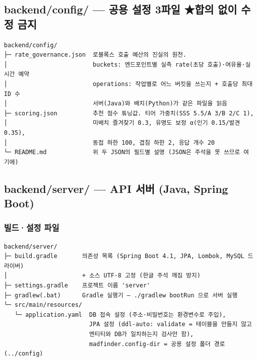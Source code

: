 \documentclass[11pt]{article}
\begin{document}
\subsection{backend/config/ --- 공용 설정 3파일 ★합의 없이 수정 금지}
\begin{Verbatim}[frame=single, fontsize=\small]
backend/config/
├─ rate_governance.json  로블록스 호출 예산의 진실의 원천.
│                        buckets: 엔드포인트별 실측 rate(초당 호출)·여유율·실시간 예약
│                        operations: 작업별로 어느 버킷을 쓰는지 + 호출당 최대 ID 수
│                        서버(Java)와 배치(Python)가 같은 파일을 읽음
├─ scoring.json          추천 점수 튜닝값. 티어 가중치(SSS 5.5/A 3/B 2/C 1),
│                        미배치 즐겨찾기 0.3, 유명도 보정 α(인기 0.15/발견 0.35),
│                        동접 하한 100, 겹침 하한 2, 응답 개수 20
└─ README.md             위 두 JSON의 필드별 설명 (JSON은 주석을 못 쓰므로 여기에)
\end{Verbatim}

\subsection{backend/server/ --- API 서버 (Java, Spring Boot)}

\subsubsection*{빌드·설정 파일}
\begin{Verbatim}[frame=single, fontsize=\small]
backend/server/
├─ build.gradle       의존성 목록 (Spring Boot 4.1, JPA, Lombok, MySQL 드라이버)
│                     + 소스 UTF-8 고정 (한글 주석 깨짐 방지)
├─ settings.gradle    프로젝트 이름 'server'
├─ gradlew(.bat)      Gradle 실행기 — ./gradlew bootRun 으로 서버 실행
└─ src/main/resources/
   └─ application.yaml  DB 접속 설정 (주소·비밀번호는 환경변수로 주입),
                        JPA 설정 (ddl-auto: validate = 테이블을 만들지 않고
                        엔티티와 DB가 일치하는지 검사만 함),
                        madfinder.config-dir = 공용 설정 폴더 경로 (../config)
\end{Verbatim}
\end{document}
